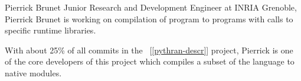 \begin{participant}[type=R,PM=12,gender=male]{Pierrick Brunet}
  Junior Research and Development Engineer at INRIA Grenoble, Pierrick Brunet is working
  on compilation of  program to  programs 
  with calls to specific  runtime libraries.

  With about 25\% of all commits in the \Pythran~[\ref{pythran-descr}] project, 
  Pierrick is one of the core developers of
  this project which compiles a subset of the \Python language to native \Python modules.

\end{participant}
